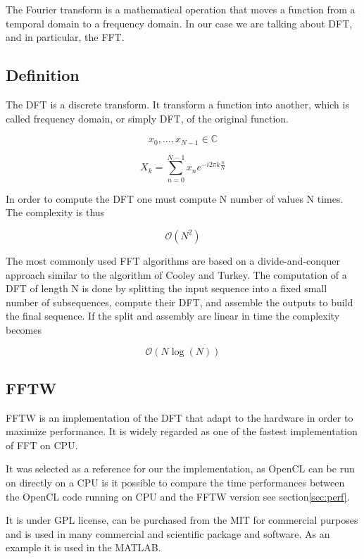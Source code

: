 The Fourier transform is a mathematical operation that moves a function from a temporal domain to a frequency domain. In our case we are talking about \gls{DFT}, and in particular, the \gls{FFT}.

	\subsection{Definition}

	The \gls{DFT} is a discrete transform. It transform a function into another, which is called frequency domain, or simply \gls{DFT}, of the original function.

	$$ x_0,...,x_{N -1} \in \mathbb{C} $$

	$$ X_{k} = \displaystyle\sum\limits_{n = 0}^{N -1} x_{n}e^{-i 2 \pi k \frac{n}{N}} $$

	In order to compute the \gls{DFT} one must compute N number of values N times. The complexity is thus

	$$ \mathcal{O}(N^{2}) $$

	The most commonly used \gls{FFT} algorithms are based on a divide-and-conquer approach similar to the algorithm of Cooley and Turkey\cite{Cooley65}. The computation of a \gls{DFT} of length N is done by splitting the input sequence into a fixed small number of subsequences, compute their \gls{DFT}, and assemble the outputs to build the final sequence. If the split and assembly are linear in time the complexity becomes 

	$$ \mathcal{O}(N \log(N)) $$

   	\subsection{FFTW}

   	\Gls{FFTW} is an implementation of the \gls{DFT} that adapt to the hardware in order to maximize performance\cite{fftw05}. It is widely regarded as one of the fastest implementation of \gls{FFT} on \gls{CPU}.

   	It was selected as a reference for our the implementation, as \gls{OpenCL} can be run on directly on a \gls{CPU} is it possible to compare the time performances between the \gls{OpenCL} code running on \gls{CPU} and the \gls{FFTW} version see section\ref{sec:perf}.

   	It is under GPL license, can be purchased from the \gls{MIT} for commercial purposes and is used in many commercial and scientific package and software. As an example it is used in the MATLAB.

